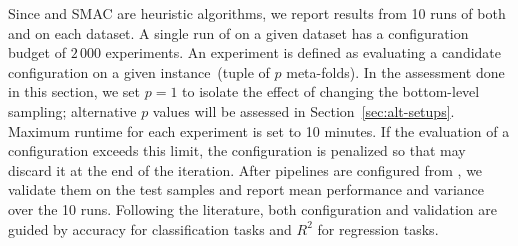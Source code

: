 

Since \irace and SMAC are heuristic algorithms, we report results from 10 runs of both \isklearn and \autosklearn on each dataset.
A single run of \isklearn on a given dataset has a configuration budget of $2\,000$ experiments. An experiment is defined as evaluating a candidate configuration on a given instance~(tuple of $p$ meta-folds). In the assessment done in this section, we set $p=1$ to isolate the effect of changing the bottom-level sampling; alternative $p$ values will be assessed in Section~\ref{sec:alt-setups}. Maximum runtime for each experiment is set to 10 minutes. If the evaluation of a configuration exceeds this limit, the configuration is penalized so that \irace may discard it at the end of the iteration. After pipelines are configured from \isklearn, we validate them on the test samples and report mean performance and variance over the 10 runs. Following the literature, both configuration and validation are guided by accuracy for classification tasks and $R^2$ for regression tasks. 

